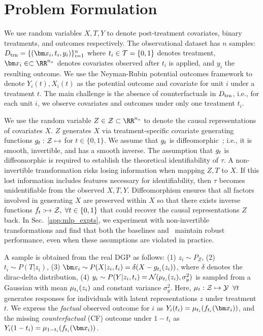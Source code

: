
\section{Problem Formulation}
\label{sec:problem_formulation}
\vspace{-0.3cm}
We use  random variables $X, T, Y$ to denote post-treatment covariates, binary treatments, and outcomes respectively. The observational dataset has $n$ samples: $\trnD = \{(\xb_i, t_i, y_i)\}_{i=1}^n$ where $t_i \in \mathcal{T} = \{0, 1\}$ denotes treatment, $\xb_i \in \xspace \subset \RR^{n_x}$ denotes covariates observed after $t_i$ is applied, and $y_i$ the resulting outcome. We use the Neyman-Rubin potential outcomes framework to denote $Y_i(t), X_i(t)$ as the potential outcome and covariate for unit $i$ under a treatment $t$. The main challenge is the absence of counterfactuals in $D_{\text{trn}}$, i.e., for each unit $i$, we observe covariates and outcomes under only one treatment $t_i$.

We use the random variable $Z \in \Zspace \subset \RR^{n_z}$ to denote the causal representations of covariates $X$. $Z$ generates $X$ via treatment-specific covariate generating functions $g_t: \mathcal{Z} \mapsto $ for $t\in \{0,1\}$. We assume that $g_t$ is diffeomorphic~\citep{locatello2019challenging, locatello2019disentangling, von2021self}; i.e., it is smooth, invertible, and has a smooth inverse. The assumption that $g_t$ is diffeomorphic is required to establish the theoretical identifiability of $\tau$. A non-invertible transformation risks losing information when mapping $Z, T$ to $X$. If this lost information includes features necessary for identifiability, then $\tau$ becomes unidentifiable from the observed $X, T, Y$. Diffeomorphism ensures that all factors involved in generating $X$ are preserved within $X$ so that there exists inverse functions $f_t:  \mapsto \mathcal{Z},\; \forall t \in \{0, 1\}$ that could recover the causal representations $Z$ back.  
In Sec.~\ref{app:mlp_expts}, we experiment with non-invertible transformations and find that both the baselines and \our\ maintain robust performance, even when these assumptions are violated in practice.


A sample is obtained from the real DGP as follows: (1) $z_i \sim P_Z$, (2) $t_i \sim P(T|z_i)$, (3) $\xb_i \sim P(X|z_i, t_i) = \delta(X - \R_{t_i}(z_i))$, where $\delta$ denotes the dirac-delta distribution, (4) $y_i \sim P(Y|z_i, t_i) = \mathcal{N}(\mu_{t_i}(z_i), \sigma_y^2)$ is sampled from a Gaussian with mean $\mu_{t_i}(z_i)$ and constant variance $\sigma_y^2$. Here, $\mu_t : \mathcal{Z} \mapsto \mathcal{Y} \;\;\forall t$ generates responses for individuals with latent representations $z$ under treatment $t$. 
We express the {\em factual} observed outcome for $i$ as $Y_i(t_i) = \realmu_{t_i}(\RInv_{t_i}(\xb_i))$, and the missing {\em counterfactual} (CF) outcome under $1-t_i$ as $Y_i(1-t_i) = \realmu_{1-t_i}(\RInv_{t_i}(\xb_i))$.


